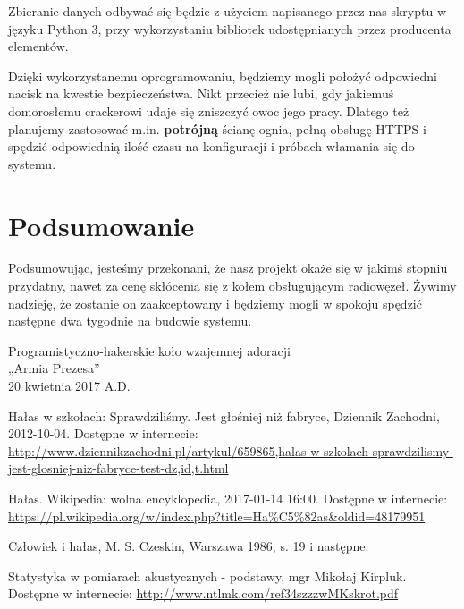 \documentclass[12pt, a4paper]{article}
\begin{document}
Zbieranie danych odbywać się będzie z użyciem napisanego przez nas skryptu w języku Python 3, przy wykorzystaniu bibliotek udostępnianych przez producenta elementów. 

Dzięki wykorzystanemu oprogramowaniu, będziemy mogli położyć odpowiedni nacisk na kwestie bezpieczeństwa. Nikt przecież nie lubi, gdy jakiemuś domorosłemu crackerowi udaje się zniszczyć owoc jego pracy. Dlatego też planujemy zastosować m.in. {\color{red}\textbf{potrójną} ścianę ognia}, pełną obsługę HTTPS i spędzić odpowiednią ilość czasu na konfiguracji i próbach włamania się do systemu.

\section{Podsumowanie}

Podsumowując, jesteśmy przekonani, że nasz projekt okaże się w jakimś stopniu przydatny, nawet za cenę skłócenia się z kołem obsługującym radiowęzeł. Żywimy nadzieję, że zostanie on zaakceptowany i będziemy mogli w spokoju spędzić następne dwa tygodnie na budowie systemu.

\begin{flushright}
Programistyczno-hakerskie koło wzajemnej adoracji\\
„Armia Prezesa”\\
20 kwietnia 2017 A.D.
\end{flushright}

\begin{thebibliography}{9}

  Hałas w szkołach: Sprawdziliśmy. Jest głośniej niż fabryce, Dziennik Zachodni, 2012-10-04. Dostępne w internecie: \url{http://www.dziennikzachodni.pl/artykul/659865,halas-w-szkolach-sprawdzilismy-jest-glosniej-niz-fabryce-test-dz,id,t.html}

  Hałas. Wikipedia: wolna encyklopedia, 2017-01-14 16:00. Dostępne w internecie: \url{https://pl.wikipedia.org/w/index.php?title=Ha%C5%82as&oldid=48179951}
  
  Człowiek i hałas, M. S. Czeskin, Warszawa 1986, s. 19 i następne.
  
  Statystyka w pomiarach akustycznych - podstawy, mgr Mikołaj Kirpluk. Dostępne w internecie: \url{http://www.ntlmk.com/ref34szzzwMKskrot.pdf}
\end{thebibliography}
\end{document}
